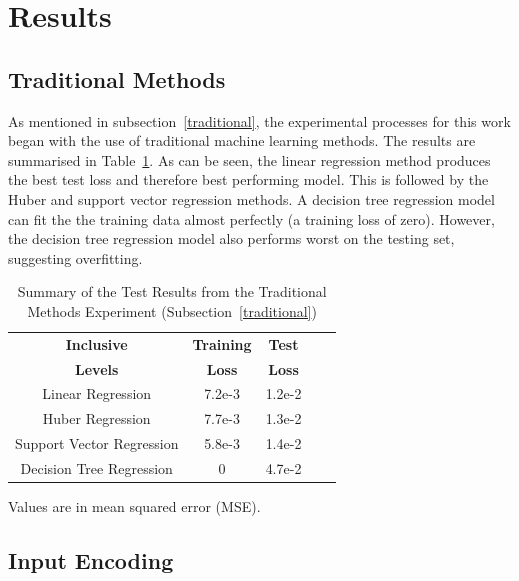 \section{Results} \label{results}

\subsection{Traditional Methods}

As mentioned in subsection~\ref{traditional}, the experimental processes for this work began with the use of traditional machine learning methods. The results are summarised in Table~\ref{tab:traditional}. As can be seen, the linear regression method produces the best test loss and therefore best performing model. This is followed by the Huber and support vector regression methods. A decision tree regression model can fit the the training data almost perfectly (a training loss of zero). However, the decision tree regression model also performs worst on the testing set, suggesting overfitting.  

\begin{table}[h!]
	\begin{center}
		
		\begin{tabular}{c|c|c|r|c} %
			\textbf{Inclusive} & \textbf{Training} & \textbf{Test} \\
			
			\textbf{Levels} & \textbf{Loss} & \textbf{Loss} \\
			\hline
			Linear Regression & 7.2e-3 & 1.2e-2 \\
			Huber Regression & 7.7e-3 &  1.3e-2 \\
			Support Vector Regression & 5.8e-3 &  1.4e-2 \\
			Decision Tree Regression & 0 & 4.7e-2 \\
		\end{tabular}
		\caption{Summary of the Test Results from the Traditional Methods Experiment (Subsection~\ref{traditional})} {Values are in mean squared error (MSE). }
		\label{tab:traditional}
	\end{center}
\end{table}


\subsection{Input Encoding} \label{encoding_results}

